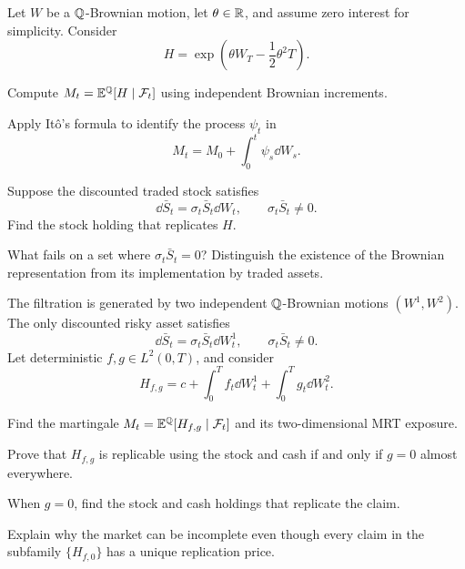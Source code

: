 \begin{exercise}
Let \(W\) be a \(\mathbb Q\)-Brownian motion, let \(\theta\in\mathbb{R}\), and assume
zero interest for simplicity. Consider
\[
H=\exp\left(\theta W_T-\frac12\theta^2T\right).
\]
\begin{exparts}
  \item Compute \(M_t=\mathbb E^{\mathbb Q}[H\mid\mathcal F_t]\) using independent Brownian
  increments.
  \item Apply It\^o's formula to identify the process \(\psi_t\) in
  \[
  M_t=M_0+\int_0^t\psi_s\dd W_s.
  \]
  \item Suppose the discounted traded stock satisfies
  \[
  \dd\bar S_t=\sigma_t\bar S_t\dd W_t,
  \qquad \sigma_t\bar S_t\neq0.
  \]
  Find the stock holding that replicates \(H\).
  \item What fails on a set where \(\sigma_t\bar S_t=0\)? Distinguish the
  existence of the Brownian representation from its implementation by
  traded assets.
\end{exparts}
\end{exercise}

\begin{exercise}
The filtration is generated by two independent \(\mathbb Q\)-Brownian motions
\((W^1,W^2)\). The only discounted risky asset satisfies
\[
\dd\bar S_t=\sigma_t\bar S_t\dd W_t^1,
\qquad \sigma_t\bar S_t\neq0.
\]
Let deterministic \(f,g\in L^2(0,T)\), and consider
\[
H_{f,g}
=c+\int_0^Tf_t\dd W_t^1+\int_0^Tg_t\dd W_t^2.
\]
\begin{exparts}
  \item Find the martingale
  \(M_t=\mathbb E^{\mathbb Q}[H_{f,g}\mid\mathcal F_t]\) and its two-dimensional MRT exposure.
  \item Prove that \(H_{f,g}\) is replicable using the stock and cash if and
  only if \(g=0\) almost everywhere.
  \item When \(g=0\), find the stock and cash holdings that replicate the
  claim.
  \item Explain why the market can be incomplete even though every claim in
  the subfamily \(\{H_{f,0}\}\) has a unique replication price.
\end{exparts}
\end{exercise}

